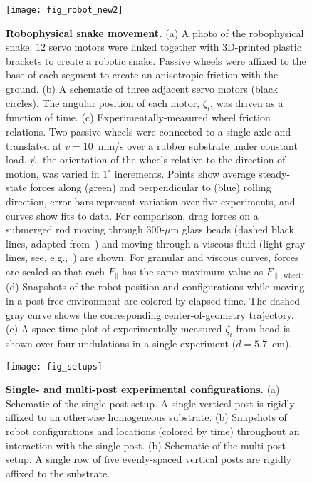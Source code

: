 \documentclass[aps,pre,twocolumn,superscriptaddress]{revtex4-1}
\begin{document}
\clearpage
\begin{figure}[ht!]
	\texttt{[image: fig\_robot\_new2]}
	\caption{\textbf{Robophysical snake movement.} (a) A photo of the robophysical snake. $12$ servo motors were linked together with $3$D-printed plastic brackets to create a robotic snake. Passive wheels were affixed to the base of each segment to create an anisotropic friction with the ground. (b) A schematic of three adjacent servo motors (black circles). The angular position of each motor, $\zeta_i$, was driven as a function of time. (c) Experimentally-measured wheel friction relations. Two passive wheels were connected to a single axle and translated at $v = 10$~mm/s over a rubber substrate under constant load. $\psi$, the orientation of the wheels relative to the direction of motion, was varied in $1^\circ$ increments. Points show average steady-state forces along (green) and perpendicular to (blue) rolling direction, error bars represent variation over five experiments, and curves show fits to data. For comparison, drag forces on a submerged rod moving through $300$-$\mu$m glass beads (dashed black lines, adapted from~\cite{sharpe2015locomotor}) and moving through a viscous fluid  (light gray lines, see, e.g.,~\cite{batchelor1970slender}) are shown. For granular and viscous curves, forces are scaled so that each $F_{\parallel}$ has the same maximum value as $F_{\parallel,\mbox{wheel}}$. (d) Snapshots of the robot position and configurations while moving in a post-free environment are colored by elapsed time. The dashed gray curve shows the corresponding center-of-geometry trajectory. (e) A space-time plot of experimentally measured $\zeta_i$ from head is shown over four undulations in a single experiment ($d=5.7$~cm).}
	\label{fig:robot}
\end{figure}


\begin{figure}[ht!]
	\texttt{[image: fig\_setups]}
	\caption{\textbf{Single- and multi-post experimental configurations.} (a) Schematic of the single-post setup.  A single vertical post is rigidly affixed to an otherwise homogeneous substrate. (b) Snapshots of robot configurations and locations (colored by time) throughout an interaction with the single post. (b) Schematic of the multi-post setup. A single row of five evenly-spaced vertical posts are rigidly affixed to the substrate. }
	\label{fig:setups}
\end{figure}
\end{document}
